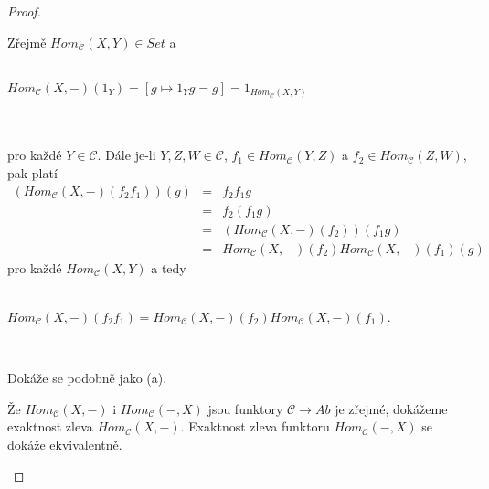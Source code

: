     \begin{proof}
      \begin{description}
        \item
        \item[(a)] Zřejmě $Hom_{\mathcal C}(X,Y)\in Set$ a \\\\
          \centerline{$Hom_{\mathcal C}(X,-)(1_Y)=[g\mapsto 1_Yg=g]=1_{Hom_{\mathcal C}(X,Y)}$} 
          \\\\
          pro každé $Y\in \mathcal C$. Dále je-li $Y,Z,W\in \mathcal C$, $f_1\in Hom_{\mathcal C}(Y,Z)$ 
          a $f_2\in Hom_{\mathcal C}(Z,W)$, pak platí 
          \begin{eqnarray}
            (Hom_{\mathcal C}(X,-)(f_2f_1))(g) 
            &=& f_2f_1g \nonumber \\
            &=& f_2(f_1g) \nonumber \\
            &=& (Hom_{\mathcal C}(X,-)(f_2))(f_1g) \nonumber \\
            &=& Hom_{\mathcal C}(X,-)(f_2)Hom_{\mathcal C}(X,-)(f_1)(g) \nonumber
          \end{eqnarray}
          pro každé $Hom_{\mathcal C}(X,Y)$ a tedy \\\\
          \centerline{$Hom_{\mathcal C}(X,-)(f_2f_1)=Hom_{\mathcal C}(X,-)(f_2)Hom_{\mathcal 
          C}(X,-)(f_1)$.}\\
        \item[(b)] Dokáže se podobně jako (a).
        \item[(c)] Že $Hom_{\mathcal C}(X,-)$ i $Hom_{\mathcal C}(-,X)$ jsou 
          funktory $\mathcal C\to Ab$ je zřejmé, dokážeme exaktnost zleva $Hom_{\mathcal 
          C}(X,-)$. Exaktnost zleva funktoru $Hom_{\mathcal C}(-,X)$ se dokáže ekvivalentně. 
          

\end{description}
\end{proof}
